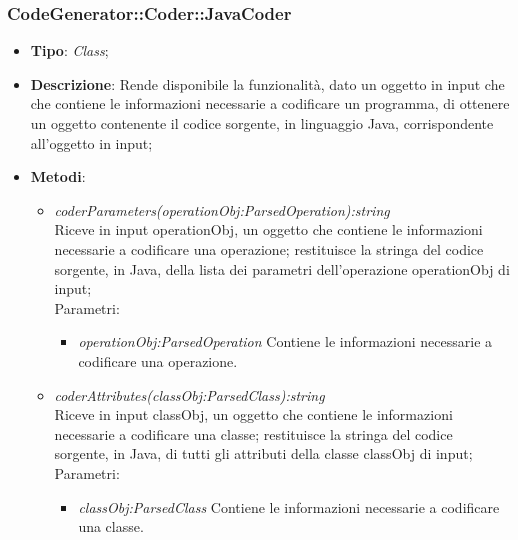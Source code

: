 \documentclass[../DefinizioneDiProdotto.tex]{subfiles}
\begin{document}
			\subsubsection{CodeGenerator::Coder::JavaCoder}
			\hypertarget{SWEDesigner::Server::CodeGenerator::Coder::JavaCoder}{}
			\begin{itemize}
				\item \textbf{Tipo}: \emph{Class};
				\item \textbf{Descrizione}: Rende disponibile la funzionalità, dato un oggetto in input che che contiene le informazioni necessarie a codificare un programma, di ottenere un oggetto contenente il codice sorgente, in linguaggio Java, corrispondente all'oggetto in input;\\
				\item \textbf{Metodi}:
				\begin{itemize}
					\item \emph{coderParameters(operationObj:ParsedOperation):string} \\ 
					Riceve in input operationObj, un oggetto che contiene le informazioni necessarie a codificare una operazione; 
					restituisce la stringa del codice sorgente, in Java, della lista dei parametri dell'operazione operationObj di input; \\
					Parametri:
					\begin{itemize}
						\item \emph{operationObj:ParsedOperation} Contiene le informazioni necessarie a codificare una operazione.
					\end{itemize}
					
					\item \emph{coderAttributes(classObj:ParsedClass):string} \\ 
					Riceve in input classObj, un oggetto che contiene le informazioni necessarie a codificare una classe; 
					restituisce la stringa del codice sorgente, in Java, di tutti gli attributi della classe classObj di input; \\
					Parametri:
					\begin{itemize}
						\item \emph{classObj:ParsedClass} Contiene le informazioni necessarie a codificare una classe.
					\end{itemize}
					

\end{itemize}
\end{itemize}
\end{document}
